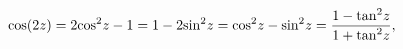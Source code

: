 \[\mathop{\cos\/}\nolimits\!\left(2z\right)=2{\mathop{\cos\/}\nolimits^{2}}z-1=1%
-2{\mathop{\sin\/}\nolimits^{2}}z={\mathop{\cos\/}\nolimits^{2}}z-{\mathop{%
\sin\/}\nolimits^{2}}z=\frac{1-{\mathop{\tan\/}\nolimits^{2}}z}{1+{\mathop{%
\tan\/}\nolimits^{2}}z},\]